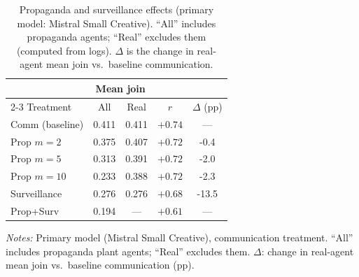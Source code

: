 \begin{table}[t]
\centering
\caption{Propaganda and surveillance effects (primary model: Mistral Small Creative). ``All'' includes propaganda agents; ``Real'' excludes them (computed from logs). $\Delta$ is the change in real-agent mean join vs.\ baseline communication.}
\label{tab:surveillance_propaganda}
\small
\begin{tabular}{lcccc}
\toprule
 & \multicolumn{2}{c}{Mean join} & & \\
\cmidrule(lr){2-3}
Treatment & All & Real & $r$ & $\Delta$ (pp) \\
\midrule
Comm (baseline) & 0.411 & 0.411 & $+0.74$ & --- \\
\midrule
Prop $m=2$ & 0.375 & 0.407 & $+0.72$ & -0.4 \\
Prop $m=5$ & 0.313 & 0.391 & $+0.72$ & -2.0 \\
Prop $m=10$ & 0.233 & 0.388 & $+0.72$ & -2.3 \\
\midrule
Surveillance & 0.276 & 0.276 & $+0.68$ & -13.5 \\
Prop+Surv & 0.194 & --- & $+0.61$ & --- \\
\bottomrule
\end{tabular}
\vspace{0.25em}
\parbox{\columnwidth}{\footnotesize\emph{Notes:} Primary model (Mistral Small Creative), communication treatment. ``All'' includes propaganda plant agents; ``Real'' excludes them. $\Delta$: change in real-agent mean join vs.\ baseline communication (pp).}
\end{table}
